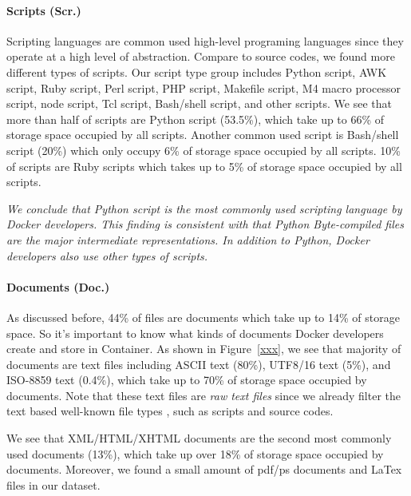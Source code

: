\paragraph{Scripts (Scr.)}
Scripting languages are common used high-level programing languages since they operate at a high level of abstraction. Compare to source codes, we found more different types of scripts. 
Our script type group includes Python script, AWK script, Ruby script, Perl script, PHP script, Makefile script, M4 macro processor script, node script, Tcl script, Bash/shell script, and other scripts.
We see that more than half of scripts are Python script (53.5\%), which take up to 66\% of storage space occupied by all scripts. Another common used script is Bash/shell script (20\%) which only occupy 6\% of storage space occupied by all scripts. 10\% of scripts are Ruby scripts which takes up to 5\% of storage space occupied by all scripts. %

\textit{We conclude that Python script is the most commonly used scripting language by Docker developers. This finding is consistent with that Python Byte-compiled files are the major intermediate representations.
	In addition to Python, Docker developers also use other types of scripts.}

\paragraph{Documents (Doc.)}
As discussed before, 44\% of files are documents which take up to 14\% of storage space. So it's important to know what kinds of documents Docker developers create and store in Container. 
As shown in Figure~\ref{xxx}, we see that majority of documents are text files including ASCII text (80\%), UTF8/16 text (5\%), and ISO-8859 text (0.4\%), which take up to 70\% of storage space occupied by documents. Note that these text files are \textit{raw text files} since we already filter the text based well-known file types%
, such as scripts and source codes.

We see that XML/HTML/XHTML documents are the second most commonly used documents (13\%), which take up over 18\% of storage space occupied by documents. Moreover, we found a small amount of pdf/ps documents and LaTex files in our dataset.%

